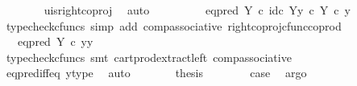 \begin{isabellebody}
\ \ \ \ \ \ \isamarkupfalse%
\ u{\isacharunderscore}{\kern0pt}is{\isacharunderscore}{\kern0pt}right{\isacharunderscore}{\kern0pt}coproj\ \isamarkupfalse%
\ auto\isanewline
\ \ \ \ \isamarkupfalse%
\ \isamarkupfalse%
\ {\isachardoublequoteopen}{\isachardot}{\kern0pt}{\isachardot}{\kern0pt}{\isachardot}{\kern0pt}\ {\isacharequal}{\kern0pt}\ {\isacharparenleft}{\kern0pt}eq{\isacharunderscore}{\kern0pt}pred\ Y\ {\isasymcirc}\isactrlsub c\ {\isasymlangle}id\isactrlsub c\ Y{\isacharcomma}{\kern0pt}y\ {\isasymcirc}\isactrlsub c\ {\isasymbeta}\isactrlbsub Y\isactrlesub {\isasymrangle}{\isacharparenright}{\kern0pt}\ {\isasymcirc}\isactrlsub c\ y{\isachardoublequoteclose}\isanewline
\ \ \ \ \ \ \isamarkupfalse%
\ {\isacharparenleft}{\kern0pt}typecheck{\isacharunderscore}{\kern0pt}cfuncs{\isacharcomma}{\kern0pt}\ simp\ add{\isacharcolon}{\kern0pt}\ comp{\isacharunderscore}{\kern0pt}associative{}\ right{\isacharunderscore}{\kern0pt}coproj{\isacharunderscore}{\kern0pt}cfunc{\isacharunderscore}{\kern0pt}coprod{\isacharparenright}{\kern0pt}\isanewline
\ \ \ \ \isamarkupfalse%
\ \isamarkupfalse%
\ {\isachardoublequoteopen}{\isachardot}{\kern0pt}{\isachardot}{\kern0pt}{\isachardot}{\kern0pt}\ {\isacharequal}{\kern0pt}\ eq{\isacharunderscore}{\kern0pt}pred\ Y\ {\isasymcirc}\isactrlsub c\ {\isasymlangle}y{\isacharcomma}{\kern0pt}y{\isasymrangle}{\isachardoublequoteclose}\isanewline
\ \ \ \ \ \ \isamarkupfalse%
\ {\isacharparenleft}{\kern0pt}typecheck{\isacharunderscore}{\kern0pt}cfuncs{\isacharcomma}{\kern0pt}\ smt\ cart{\isacharunderscore}{\kern0pt}prod{\isacharunderscore}{\kern0pt}extract{\isacharunderscore}{\kern0pt}left\ comp{\isacharunderscore}{\kern0pt}associative{}{\isacharparenright}{\kern0pt}\isanewline
\ \ \ \ \isamarkupfalse%
\ \isamarkupfalse%
\ {\isachardoublequoteopen}{\isachardot}{\kern0pt}{\isachardot}{\kern0pt}{\isachardot}{\kern0pt}\ {\isacharequal}{\kern0pt}\ {\isasymt}{\isachardoublequoteclose}\isanewline
\ \ \ \ \ \ \isamarkupfalse%
\ eq{\isacharunderscore}{\kern0pt}pred{\isacharunderscore}{\kern0pt}iff{\isacharunderscore}{\kern0pt}eq\ y{\isacharunderscore}{\kern0pt}type\ \isamarkupfalse%
\ auto\isanewline
\ \ \ \ \isamarkupfalse%
\ \isamarkupfalse%
\ {\isacharquery}{\kern0pt}thesis\isanewline
\ \ \ \ \ \ \isamarkupfalse%
\ case{}\ \isamarkupfalse%
\ argo\isanewline

\end{isabellebody}
